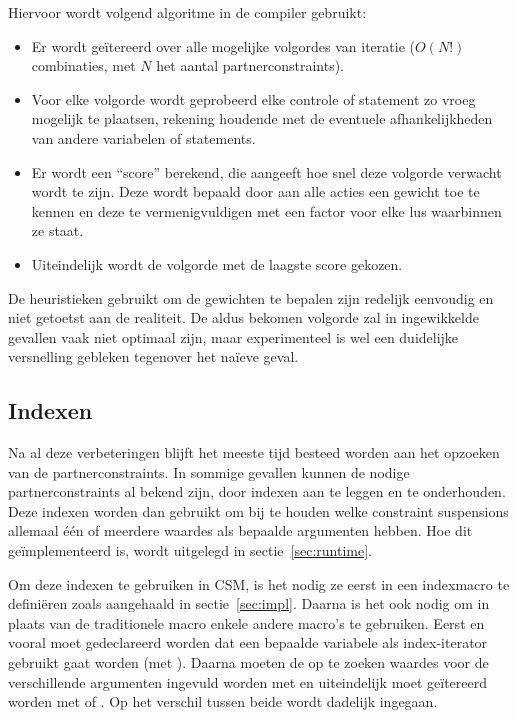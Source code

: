 {Hiervoor wordt volgend algoritme in de compiler gebruikt: \begin{itemize}
  \item Er wordt ge\"itereerd over alle mogelijke volgordes van iteratie ($O(N!)$ combinaties, met $N$ het aantal partnerconstraints).
  \item Voor elke volgorde wordt geprobeerd elke controle of statement zo vroeg mogelijk te plaatsen, rekening houdende met de eventuele afhankelijkheden van andere variabelen of statements.
  \item Er wordt een ``score'' berekend, die aangeeft hoe snel deze volgorde verwacht wordt te zijn. Deze wordt bepaald door aan alle acties een gewicht toe te kennen en deze te vermenigvuldigen met een factor voor elke lus waarbinnen ze staat.
  \item Uiteindelijk wordt de volgorde met de laagste score gekozen.
\end{itemize}
De heuristieken gebruikt om de gewichten te bepalen zijn redelijk eenvoudig en niet getoetst aan de realiteit. De aldus bekomen volgorde zal in ingewikkelde gevallen vaak niet optimaal zijn, maar experimenteel is wel een duidelijke versnelling gebleken tegenover het na\"ieve geval.

\subsection{Indexen} \label{gencode-index}


Na al deze verbeteringen blijft het meeste tijd besteed worden aan het opzoeken van de partnerconstraints. In sommige gevallen kunnen de nodige partnerconstraints al bekend zijn, door indexen aan te leggen en te onderhouden. Deze indexen worden dan gebruikt om bij te houden welke constraint suspensions allemaal \'e\'en of meerdere waardes als bepaalde argumenten hebben. Hoe dit ge\"implementeerd is, wordt uitgelegd in sectie~\ref{sec:runtime}.

Om deze indexen te gebruiken in CSM, is het nodig ze eerst in een indexmacro te defini\"eren zoals aangehaald in sectie~\ref{sec:impl}. Daarna is het ook nodig om in plaats van de traditionele  macro enkele andere macro's te gebruiken. Eerst en vooral moet gedeclareerd worden dat een bepaalde variabele als index-iterator gebruikt gaat worden (met ). Daarna moeten de op te zoeken waardes voor de verschillende argumenten ingevuld worden met  en uiteindelijk moet ge\"itereerd worden met  of . Op het verschil tussen beide wordt dadelijk ingegaan.

}
